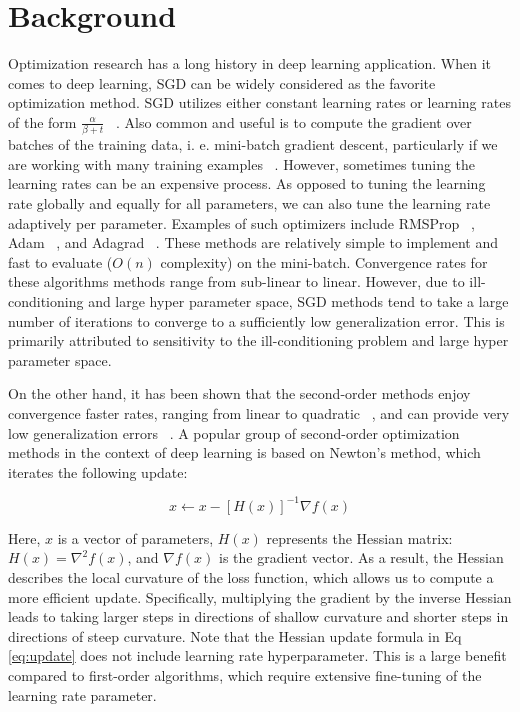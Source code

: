\documentclass[10pt,twocolumn,letterpaper]{article}
\begin{document}
\section{Background}
\label{sec:background}


Optimization research has a long history in deep learning application. When it comes to deep learning, SGD can be widely considered as the favorite optimization method. SGD utilizes either constant learning rates or learning rates of the form $\frac{\alpha}{\beta + t}$ ~\cite{Zinkevich10}. Also common and useful is to compute the gradient over batches of the training data, i. e. mini-batch gradient descent, particularly if we are working with many training examples ~\cite{Goyal17}. However, sometimes tuning the learning rates can be an expensive process. As opposed to tuning the learning rate globally and equally for all parameters, we can also tune the learning rate adaptively per parameter. Examples of such optimizers include RMSProp ~\cite{Tieleman12}, Adam ~\cite{Kingma14}, and Adagrad ~\cite{Duchi11}. These methods are relatively simple to implement and fast to evaluate ($O(n)$ complexity) on the mini-batch. Convergence rates for these algorithms methods range from sub-linear to linear. However, due to ill-conditioning and large hyper parameter space, SGD methods tend to take a large number of iterations to converge to a sufficiently low generalization error. This is primarily attributed to sensitivity to the ill-conditioning problem and large hyper parameter space.

On the other hand, it has been shown that the second-order methods enjoy convergence faster rates, ranging from linear to quadratic ~\cite{Nocedal06}, and can provide very low generalization errors ~\cite{Xu17}. A popular group of second-order optimization methods in the context of deep learning is based on Newton’s method, which iterates the following update:
 
\begin{equation}
\label{eq:update}
x \leftarrow x - {[H(x)]}^{-1}  \nabla f(x)
\end{equation}

Here, $x$ is a vector of parameters, $H(x)$ represents the Hessian matrix: $H(x) = \nabla^2 f(x)$, and $\nabla f(x)$ is the gradient vector. As a result, the Hessian describes the local curvature of the loss function, which allows us to compute a more efficient update. Specifically, multiplying the gradient by the inverse Hessian leads to taking larger steps in directions of shallow curvature and shorter steps in directions of steep curvature. Note that the Hessian update formula in Eq \ref{eq:update} does not include learning rate hyperparameter. This is a large benefit compared to first-order algorithms, which require extensive fine-tuning of the learning rate parameter.
\end{document}

